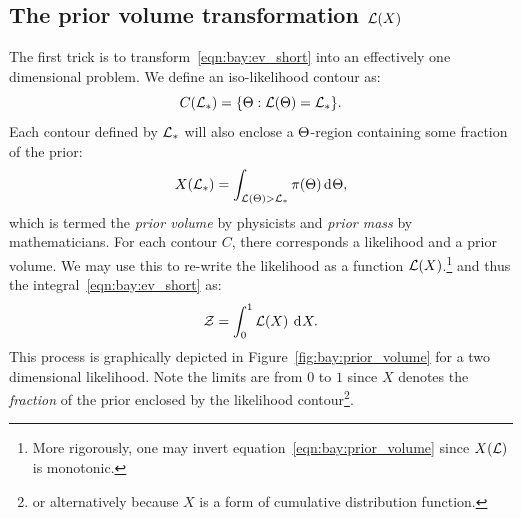 \subsection{The prior volume transformation \(\mathcal{L}(X)\)}
The first trick is to transform~\eqref{eqn:bay:ev_short} into an effectively one dimensional problem. We define an iso-likelihood contour as:
\begin{equation}
  C(\mathcal{L}_\ast) = \{\Theta : \mathcal{L}(\Theta)=\mathcal{L}_\ast \}.
  \label{eqn:bay:contour_def}
\end{equation}
Each contour defined by \(\mathcal{L}_\ast\) will also enclose a \(\Theta\)-region containing some fraction of the prior:
\begin{equation}
  X(\mathcal{L}_\ast) = \int_{\mathcal{L}(\Theta)>\mathcal{L}_\ast} \pi(\Theta) \operatorname{d}^{}\!{\Theta},
  \label{eqn:bay:prior_volume}
\end{equation}
which is termed the {\em prior volume\/} by physicists and {\em prior mass\/} by mathematicians. For each contour \(C\), there corresponds a likelihood and a prior volume. We may use this to re-write the likelihood as a function \(\mathcal{L}(X)\).\footnote{More rigorously, one may invert equation~\protect\eqref{eqn:bay:prior_volume} since \(X(\mathcal{L})\) is monotonic.} and thus the integral~\eqref{eqn:bay:ev_short} as:
\begin{equation}
  \mathcal{Z} = \int_0^1 \mathcal{L}(X)\:\operatorname{d}^{}\!{X}.
  \label{eqn:bay:ev_X}
\end{equation}
This process is graphically depicted in Figure~\ref{fig:bay:prior_volume} for a two dimensional likelihood. Note the limits are from \(0\) to \(1\) since \(X\) denotes the {\em fraction\/} of the prior enclosed by the likelihood contour\footnote{or alternatively because \(X\) is a form of cumulative distribution function.}.
%
